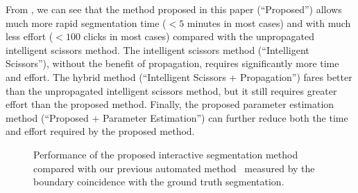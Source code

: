 \documentclass[]{spie}  %
\begin{document}
From , we can see that the method proposed in this paper
(``Proposed'') allows much more rapid segmentation time ($< 5$ minutes
in most cases) and with much less effort ($< 100$ clicks in most
cases) compared with the unpropagated intelligent scissors method.
The intelligent scissors method (``Intelligent Scissors''), without
the benefit of propagation, requires significantly more time and
effort.  The hybrid method (``Intelligent Scissors + Propagation'')
fares better than the unpropagated intelligent scissors method, but it
still requires greater effort than the proposed method.  Finally, the
proposed parameter estimation method (``Proposed + Parameter
Estimation'') can further reduce both the time and effort required by
the proposed method.

\begin{figure}[htbp]
\centering
{}

\hspace{0.1em}
\caption{Performance of the proposed interactive segmentation method
  compared with our previous automated method~\cite{waggoner:11}
  measured by the boundary coincidence with the ground truth
  segmentation.}
\label{fig:perform}
\end{figure}
\end{document}
